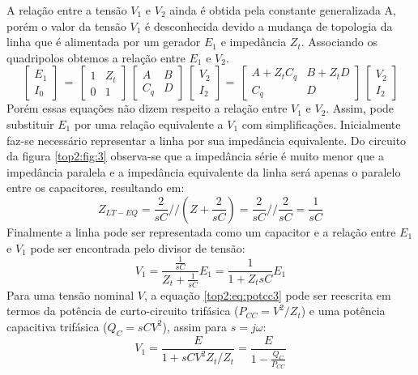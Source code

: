 A relação entre a tensão $V_1$ e $V_2$ ainda é obtida pela constante generalizada A, porém o valor da tensão $V_1$ é desconhecida devido a mudança de topologia da linha que é alimentada por um gerador $E_1$ e impedância $Z_t$. Associando os quadripolos obtemos a relação entre $E_1$ e $V_2$.
\begin{equation} \label{top2:eq:potcc1}
    \begin{bmatrix} E_1 \\ I_0  \end{bmatrix} \,=\, \begin{bmatrix} 1 & Z_t \\ 0 & 1  \end{bmatrix} \, \begin{bmatrix} A & B \\ C_q & D  \end{bmatrix}\, \begin{bmatrix} V_2 \\ I_2  \end{bmatrix} = \, \begin{bmatrix} A+Z_tC_q & B+Z_tD \\ C_q & D  \end{bmatrix} \, \begin{bmatrix} V_2 \\ I_2  \end{bmatrix} 
\end{equation}
Porém essas equações não dizem respeito a relação entre $V_1$ e $V_2$. Assim, pode substituir $E_1$ por uma relação equivalente a $V_1$ com simplificações. Inicialmente faz-se necessário representar a linha por sua impedância equivalente. Do circuito da figura \ref{top2:fig:3} observa-se que a impedância série é muito menor que a impedância paralela e a impedância equivalente da linha será apenas o paralelo entre os capacitores, resultando em:
\begin{equation} \label{top2:eq:potcc2}
Z_{LT-EQ} = \frac{2}{sC} // \left(Z + \frac{2}{sC}\right) = \frac{2}{sC} // \frac{2}{sC} = \frac{1}{sC}
\end{equation}
Finalmente a linha pode ser representada como um capacitor e a relação entre $E_1$ e $V_1$ pode ser encontrada pelo divisor de tensão:
\begin{equation} \label{top2:eq:potcc3}
V_1 = \frac{\frac{1}{sC}}{Z_t+\frac{1}{sC}}E_1 =  \frac{1}{1+Z_tsC}E_1
\end{equation}
Para uma tensão nominal $V$, a equação \ref{top2:eq:potcc3} pode ser reescrita em termos da potência de curto-circuito trifásica ($P_{CC}=V^2/Z_t$) e uma potência capacitiva trifásica ($Q_C=sCV^2$), assim para $s=j\omega$:
\begin{equation} \label{top2:eq:potcc4}
V_1 = \frac{E}{1+sCV^2Z_t/Z_t} =  \frac{E}{1 - \frac{Q_C}{P_{CC}}}
\end{equation}

